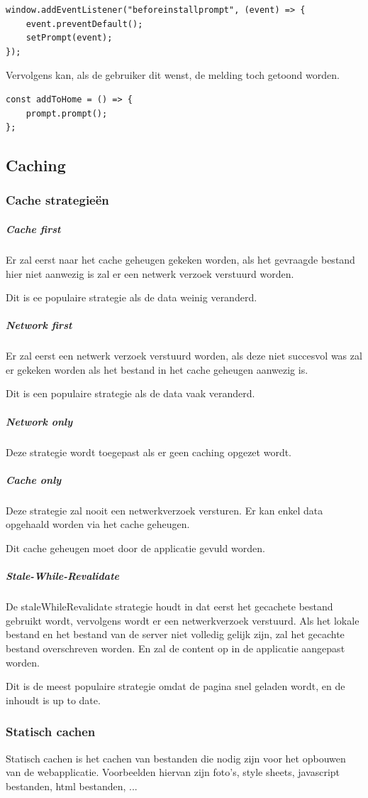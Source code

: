 \begin{lstlisting}
window.addEventListener("beforeinstallprompt", (event) => {
	event.preventDefault();
	setPrompt(event);
}); 
\end{lstlisting}

		Vervolgens kan, als de gebruiker dit wenst, de melding toch getoond worden.
		
\begin{lstlisting}
const addToHome = () => {
	prompt.prompt();
};
\end{lstlisting}
	\subsection{Caching}
	
		\subsubsection{Cache strategieën}
		
			\subparagraph{Cache first}
				Er zal eerst naar het cache geheugen gekeken worden, als het gevraagde bestand hier niet aanwezig is zal er een netwerk verzoek verstuurd worden.
				
				Dit is ee populaire strategie als de data weinig veranderd. 
			\subparagraph{Network first}
				Er zal eerst een netwerk verzoek verstuurd worden, als deze niet succesvol was zal er gekeken worden als het bestand in het cache geheugen aanwezig is. 
				
				Dit is een populaire strategie als de data vaak veranderd.
			\subparagraph{Network only}
				Deze strategie wordt toegepast als er geen caching opgezet wordt. 
			\subparagraph{Cache only}
				Deze strategie zal nooit een netwerkverzoek versturen. Er kan enkel data opgehaald worden via het cache geheugen.
				
				Dit cache geheugen moet door de applicatie gevuld worden.
			\subparagraph{Stale-While-Revalidate}
				De staleWhileRevalidate strategie houdt in dat eerst het gecachete bestand gebruikt wordt, vervolgens wordt er een netwerkverzoek verstuurd. Als het lokale bestand en het bestand van de server niet volledig gelijk zijn, zal het gecachte bestand overschreven worden. En zal de content op in de applicatie aangepast worden.
				
				Dit is de meest populaire strategie omdat de pagina snel geladen wordt, en de inhoudt is up to date.

		\subsubsection{Statisch cachen}
			Statisch cachen is het cachen van bestanden die nodig zijn voor het opbouwen van de webapplicatie. Voorbeelden hiervan zijn foto's, style sheets, javascript bestanden, html bestanden, ...
			
